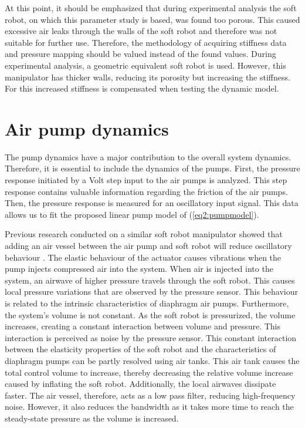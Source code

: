 At this point, it should be emphasized that during experimental analysis the soft robot, on which this parameter study is based, was found too porous. This caused excessive air leaks through the walls of the soft robot and therefore was not suitable for further use. Therefore, the methodology of acquiring stiffness data and pressure mapping should be valued instead of the found values. During experimental analysis, a geometric equivalent soft robot is used. However, this manipulator has thicker walls, reducing its porosity but increasing the stiffness. For this increased stiffness is compensated when testing the dynamic model. 




\section{Air pump dynamics}



The pump dynamics have a major contribution to the overall system dynamics. Therefore, it is essential to include the dynamics of the pumps. First, the pressure response initiated by a Volt step input to the air pumps is analyzed. This step response contains valuable information regarding the friction of the air pumps. Then, the pressure response is measured for an oscillatory input signal. This data allows us to fit the proposed linear pump model of (\ref{eq2:pumpmodel}).


Previous research conducted on a similar soft robot manipulator showed that adding an air vessel between the air pump and soft robot will reduce oscillatory behaviour \cite{proper}. The elastic behaviour of the actuator causes vibrations when the pump injects compressed air into the system. When air is injected into the system, an airwave of higher pressure travels through the soft robot. This causes local pressure variations that are observed by the pressure sensor. This behaviour is related to the intrinsic characteristics of diaphragm air pumps. Furthermore, the system's volume is not constant. As the soft robot is pressurized, the volume increases, creating a constant interaction between volume and pressure. This interaction is perceived as noise by the pressure sensor. This constant interaction between the elasticity properties of the soft robot and the characteristics of diaphragm pumps can be partly resolved using air tanks. This air tank causes the total control volume to increase, thereby decreasing the relative volume increase caused by inflating the soft robot. Additionally, the local airwaves dissipate faster. The air vessel, therefore, acts as a low pass filter, reducing high-frequency noise. However, it also reduces the bandwidth as it takes more time to reach the steady-state pressure as the volume is increased. 

